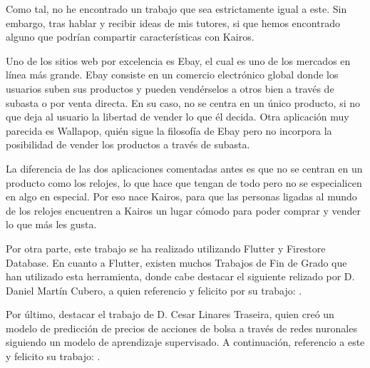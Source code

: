 
	Como tal, no he encontrado un trabajo que sea estrictamente igual a este. Sin embargo, tras hablar y recibir ideas de mis tutores, si que hemos encontrado alguno que podrían compartir características con Kairos.
	
	Uno de los sitios web por excelencia es Ebay, el cual es uno de los mercados en línea más grande. Ebay consiste en un comercio electrónico global donde los usuarios suben sus productos y pueden vendérselos a otros bien a través de subasta o por venta directa. En su caso, no se centra en un único producto, si no que deja al usuario la libertad de vender lo que él decida. Otra aplicación muy parecida es Wallapop, quién sigue la filosofía de Ebay pero no incorpora la posibilidad de vender los productos a través de subasta.
	
	La diferencia de las dos aplicaciones comentadas antes es que no se centran en un producto como los relojes, lo que hace que tengan de todo pero no se especialicen en algo en especial. Por eso nace Kairos, para que las personas ligadas al mundo de los relojes encuentren a Kairos un lugar cómodo para poder comprar y vender lo que más les gusta.
	
	Por otra parte, este trabajo se ha realizado utilizando Flutter y Firestore Database. En cuanto a Flutter, existen muchos Trabajos de Fin de Grado que han utilizado esta herramienta, donde cabe destacar el siguiente relizado por D. Daniel Martín Cubero, a quien referencio y felicito por su trabajo: \cite{daniel:dasell}.
	
	Por último, destacar el trabajo de D. Cesar Linares Traseira, quien creó un modelo de predicción de precios de acciones de bolsa a través de redes nuronales siguiendo un modelo de aprendizaje supervisado. A continuación, referencio a este y felicito su trabajo: \cite{cesar:modelo}.
	
	 
